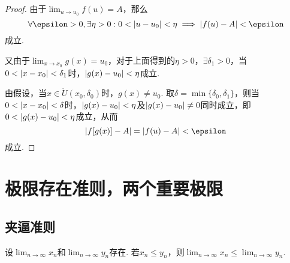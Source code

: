 \begin{theorem}
\begin{proof}
由于\(\lim_{u \to u_0} f(u) = A\)，那么\[
\forall\epsilon>0, \exists\eta>0 :
0 < \abs{u - u_0} < \eta
\implies
\abs{ f(u) - A } < \epsilon
\]成立.

又由于\(\lim_{x \to x_0} g(x) = u_0\)，对于上面得到的\(\eta > 0\)，\(\exists \delta_1 > 0\)，当\(0 < \abs{x - x_0} < \delta_1\)时，\(\abs{ g(x) - u_0 } < \eta\)成立.

由假设，当\(x \in \mathring{U}(x_0,\delta_0)\)时，\(g(x) \neq u_0\).
取\(\delta = \min\{\delta_0,\delta_1\}\)，则当\(0 < \abs{x - x_0} < \delta\)时，\(\abs{ g(x) - u_0 } < \eta\)及\(\abs{ g(x) - u_0 } \neq 0\)同时成立，即\(0 < \abs{ g(x) - u_0 } < \eta\)成立，从而\[
\abs{ f[g(x)] - A } = \abs{ f(u) - A } < \epsilon
\]成立.
\end{proof}
\end{theorem}

\section{极限存在准则，两个重要极限}
\subsection{夹逼准则}
\begin{lemma}
设\(\lim_{n\to\infty} x_n\)和\(\lim_{n\to\infty} y_n\)存在.
若\(x_n \leq y_n\)，则\(\lim_{n\to\infty} x_n \leq \lim_{n\to\infty} y_n\).
\end{lemma}

